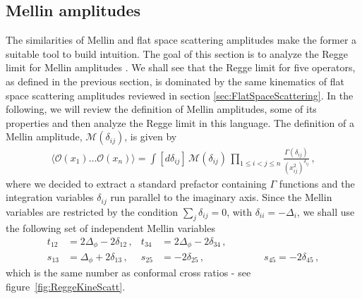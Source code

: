 \subsection{Mellin amplitudes}\label{sec:MellinMellin}
The similarities of Mellin and flat space scattering amplitudes make the former a suitable tool  to build intuition. The goal of this section is to analyze the
Regge limit for Mellin amplitudes \cite{Costa:2012cb}.
We shall see that  the Regge limit for five operators, as defined in the previous section, is dominated by the same kinematics of flat space scattering amplitudes reviewed in
section \ref{sec:FlatSpaceScattering}.
In the following, we will review the definition of Mellin amplitudes, some of its properties and then analyze the Regge limit  in this language.
The definition of a Mellin amplitude, $\mathcal{M}(\delta_{ij})$,   is given by
\begin{align}
  \langle \mathcal{O}(x_1)\dots \mathcal{O}(x_n) \rangle  = \int [d\delta_{ij}] \,\mathcal{M}(\delta_{ij})\,\prod_{1\leq i <j \leq n} \frac{\Gamma(\delta_{ij})}{(x_{ij}^2)^{\delta_{ij}}}\,,
  \label{eq:scalarMellinamplitude}
\end{align}
where we decided to extract a  standard prefactor containing $\Gamma$ functions and  the integration variables $\delta_{ij}$ run parallel to the imaginary axis.
Since the Mellin variables are restricted by the condition $\sum_{j}\delta_{ij}=0$, with   $\delta_{ii}=-\Delta_i $,
we shall use the following set of independent Mellin variables
\begin{align}
  t_{12} & = 2\Delta_{\phi}-2\delta_{12}\,,
         & t_{34}                           & = 2\Delta_{\phi}-2\delta_{34}\,,
  \\
  s_{13} & = \Delta_{\phi} +2\delta_{13}\,,
         & s_{25}                           & =-2\delta_{25}\,,
  \qquad\qquad\qquad
  s_{45} = -2\delta_{45}\,,
  \nonumber
\end{align}
which is the same number as conformal cross ratios - see figure~\ref{fig:ReggeKineScatt}.
